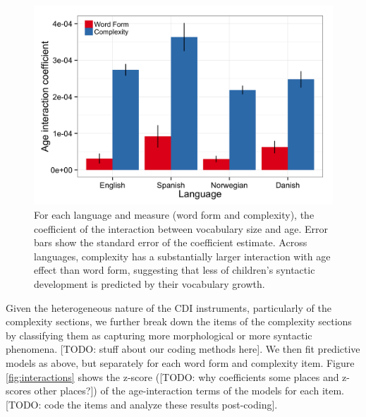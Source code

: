 \documentclass[10pt,letterpaper]{article}
\begin{document}
\begin{figure}[t]
\begin{center}
\includegraphics[width=\linewidth]{plots/coefs_wordform_complexity.png}
\end{center}
\caption{\label{fig:coefs_grammar}  For each language and measure (word form and complexity), the coefficient of the interaction between vocabulary size and age. Error bars show the standard error of the coefficient estimate. Across languages, complexity has a substantially larger interaction with age effect than word form, suggesting that less of children's syntactic development is predicted by their vocabulary growth.} 
\end{figure}

Given the heterogeneous nature of the CDI instruments, particularly of the complexity sections, we further break down the items of the complexity sections by classifying them as capturing more morphological or more syntactic phenomena. [TODO: stuff about our coding methods here]. We then fit predictive models as above, but separately for each word form and complexity item. Figure \ref{fig:interactions} shows the z-score ([TODO: why coefficients some places and z-scores other places?]) of the age-interaction terms of the models for each item. [TODO: code the items and analyze these results post-coding].
\end{document}

